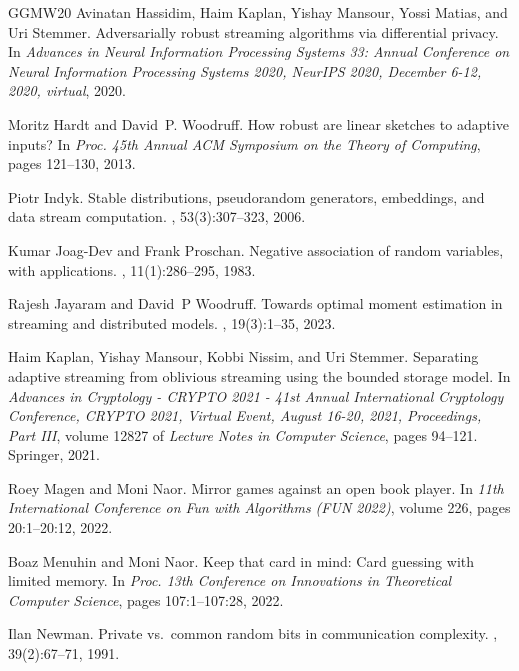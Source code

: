 \documentclass[10pt,a4paper]{article}
\theoremstyle{definition}
\theoremstyle{remark}
\begin{document}
\begin{itemize}
\begin{itemize}
\begin{thebibliography}{GGMW20}
Avinatan Hassidim, Haim Kaplan, Yishay Mansour, Yossi Matias, and Uri Stemmer.
\newblock Adversarially robust streaming algorithms via differential privacy.
\newblock In {\em Advances in Neural Information Processing Systems 33: Annual
  Conference on Neural Information Processing Systems 2020, NeurIPS 2020,
  December 6-12, 2020, virtual}, 2020.

Moritz Hardt and David~P. Woodruff.
\newblock How robust are linear sketches to adaptive inputs?
\newblock In {\em Proc. 45th Annual ACM Symposium on the Theory of Computing},
  pages 121--130, 2013.

Piotr Indyk.
\newblock Stable distributions, pseudorandom generators, embeddings, and data
  stream computation.
, 53(3):307--323, 2006.

Kumar {Joag-Dev} and Frank Proschan.
\newblock Negative association of random variables, with applications.
, 11(1):286--295, 1983.

Rajesh Jayaram and David~P Woodruff.
\newblock Towards optimal moment estimation in streaming and distributed
  models.
, 19(3):1--35, 2023.

Haim Kaplan, Yishay Mansour, Kobbi Nissim, and Uri Stemmer.
\newblock Separating adaptive streaming from oblivious streaming using the
  bounded storage model.
\newblock In {\em Advances in Cryptology - {CRYPTO} 2021 - 41st Annual
  International Cryptology Conference, {CRYPTO} 2021, Virtual Event, August
  16-20, 2021, Proceedings, Part {III}}, volume 12827 of {\em Lecture Notes in
  Computer Science}, pages 94--121. Springer, 2021.

Roey Magen and Moni Naor.
\newblock Mirror games against an open book player.
\newblock In {\em 11th International Conference on Fun with Algorithms (FUN
  2022)}, volume 226, pages 20:1--20:12, 2022.

Boaz Menuhin and Moni Naor.
\newblock Keep that card in mind: Card guessing with limited memory.
\newblock In {\em Proc. 13th Conference on Innovations in Theoretical Computer
  Science}, pages 107:1--107:28, 2022.

Ilan Newman.
\newblock Private vs.~common random bits in communication complexity.
, 39(2):67--71, 1991.


\end{thebibliography}
\end{itemize}
\end{itemize}
\end{document}
